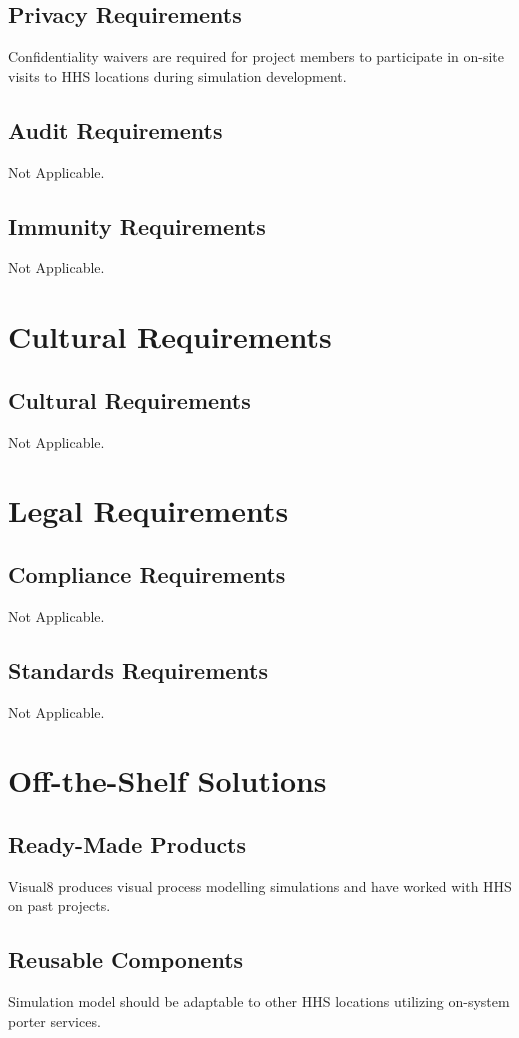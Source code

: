 \documentclass[paper=letter, fontsize=10pt]{scrartcl}
\numberwithin{equation}{section}		%
\numberwithin{figure}{section}			%
\numberwithin{table}{section}				%
\begin{document}
\subsection{Privacy Requirements}
Confidentiality waivers are required for project members to participate in on-site visits to HHS locations during simulation development.
\subsection{Audit Requirements}
Not Applicable.
\subsection{Immunity Requirements}
Not Applicable.

\section{Cultural Requirements}
\subsection{Cultural Requirements}
Not Applicable.

\section{Legal Requirements}
\subsection{Compliance Requirements}
Not Applicable.
\subsection{Standards Requirements}
Not Applicable.

\section{Off-the-Shelf Solutions}
\subsection{Ready-Made Products}
Visual8 produces visual process modelling simulations and have worked with HHS on past projects.
\subsection{Reusable Components}
Simulation model should be adaptable to other HHS locations utilizing on-system porter services.
\end{document}
